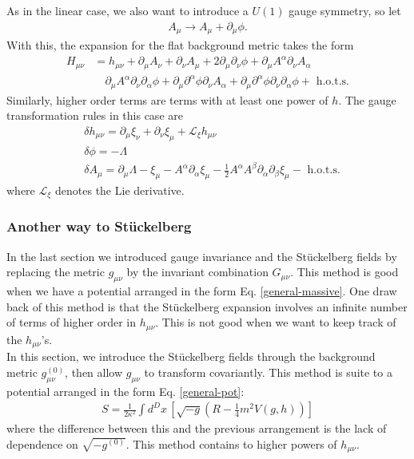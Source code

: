 \documentclass{book}
\theoremstyle{definition}
\newcommand{\p}{\partial}
\newcommand{\lag}{\mathcal{L}}
\newcommand{\nn}{\nonumber}
\newcommand{\al}{\alpha}
\newcommand{\be}{\beta}
\newcommand{\f}[2]{\frac{#1}{#2}}
\newcommand{\lp}{\left(}
\newcommand{\rp}{\right)}
\newcommand{\lb}{\left[}
\newcommand{\rb}{\right]}
\begin{document}
As in the linear case, we also want to introduce a $U(1)$ gauge symmetry, so let
\begin{align}
A_\mu \to A_\mu + \p_\mu \phi.
\end{align}
With this, the expansion for the flat background metric takes the form
\begin{align}\label{H_flat}
H_{\mu\nu} &= h_{\mu\nu} + \p_\mu A_\nu + \p_\nu A_\mu + 2\p_\mu \p_\nu \phi + \p_\mu A^\al \p_\nu A_\al \nn\\
&\quad \p_\mu A^\al \p_\nu \p_\al \phi + \p_\mu\p^\al \phi \p_\nu A_\al + \p_\mu \p^\al \phi \p_\nu \p_\al \phi + \text{ h.o.t.s.}
\end{align}
Similarly, higher order terms are terms with at least one power of $h$. The gauge transformation rules in this case are
\begin{align}\label{gauge_sym}
&\delta h_{\mu\nu} = \p_\mu \xi_\nu + \p_\nu \xi_\mu + \lag_\xi h_{\mu\nu}\\
&\delta \phi = -\Lambda\\
&\delta A_\mu = \p_\mu \Lambda -\xi_\mu - A^\al \p_\al \xi_\mu -\f{1}{2}A^\al A^\be \p_\al \p_\be \xi_\mu - \text{ h.o.t.s.}
\end{align}
where $\lag_\xi$ denotes the Lie derivative. 




\subsubsection{Another way to St\"{u}ckelberg}

In the last section we introduced gauge invariance and the St\"{u}ckelberg fields by replacing the metric $g_{\mu\nu}$ by the invariant combination $G_{\mu\nu}$. This method is good when we have a potential arranged in the form Eq. \eqref{general-massive}. One draw back of this method is that the St\"{u}ckelberg expansion involves an infinite number of terms of higher order in $h_{\mu\nu}$. This is not good when we want to keep track of the $h_{\mu\nu}$'s.\\


In this section, we introduce the St\"{u}ckelberg fields through the background metric $g^{(0)}_{\mu\nu}$, then allow $g_{\mu\nu}$ to transform covariantly. This method is suite to a potential arranged in the form Eq. \eqref{general-pot}:
\begin{align}
\boxed{S = \f{1}{2\kappa^2}\int d^Dx\, \lb \sqrt{-g}\lp R - \f{1}{4}m^2 V(g,h) \rp \rb}
\end{align}
where the difference between this and the previous arrangement is the lack of dependence on $\sqrt{-g^{(0)}}$. This method contains to higher powers of $h_{\mu\nu}$. \\
\end{document}
